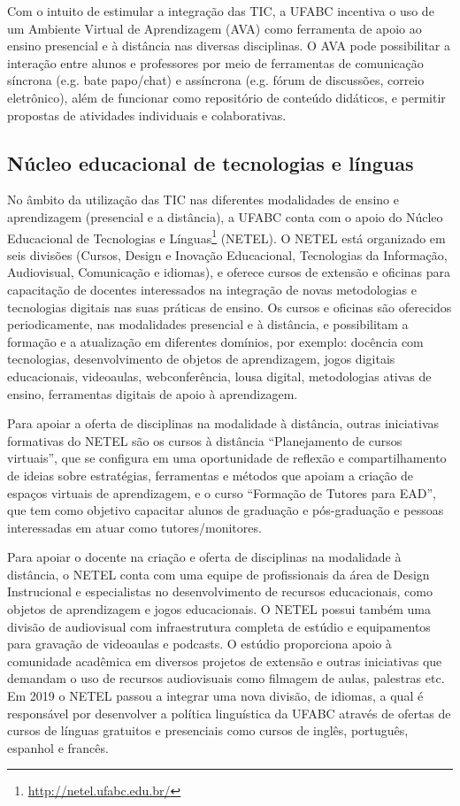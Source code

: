 Com o intuito de estimular a integração das TIC, a UFABC incentiva o uso de um
Ambiente Virtual de Aprendizagem (AVA) como ferramenta de
apoio ao ensino presencial e à distância nas diversas disciplinas. 
O AVA pode possibilitar a interação entre alunos e professores por meio de
ferramentas de comunicação síncrona (e.g. bate papo/chat) e assíncrona (e.g.
fórum de discussões, correio eletrônico), além de funcionar como repositório de
conteúdo didáticos, e permitir propostas de atividades individuais e
colaborativas.

\subsection{Núcleo educacional de tecnologias e línguas}

No âmbito da utilização das TIC nas diferentes modalidades de ensino e
aprendizagem (presencial e a distância), a UFABC conta com o
apoio do Núcleo Educacional de Tecnologias e
Línguas\footnote{\url{http://netel.ufabc.edu.br/}} (NETEL).
O NETEL está organizado em seis divisões (Cursos, Design e Inovação
Educacional, Tecnologias da Informação, Audiovisual, Comunicação e idiomas), e
oferece cursos de extensão e oficinas para capacitação de docentes interessados
na integração de novas metodologias e tecnologias digitais nas suas práticas de
ensino. 
Os cursos e oficinas são oferecidos periodicamente, nas modalidades presencial
e à distância, e possibilitam a formação e a atualização em diferentes
domínios, por exemplo: docência com tecnologias, desenvolvimento de objetos de
aprendizagem, jogos digitais educacionais, videoaulas, webconferência, lousa
digital, metodologias ativas de ensino, ferramentas digitais de apoio à
aprendizagem. 

Para apoiar a oferta de disciplinas na modalidade à distância, outras
iniciativas formativas do NETEL são os cursos à distância ``Planejamento de
cursos virtuais'', que se configura em uma oportunidade de reflexão e
compartilhamento de ideias sobre estratégias, ferramentas e métodos que apoiam
a criação de espaços virtuais de aprendizagem, e o curso ``Formação de Tutores
para EAD'', que tem como objetivo capacitar alunos de graduação e pós-graduação
e pessoas interessadas em atuar como tutores/monitores. 

Para apoiar o docente na criação e oferta de disciplinas na modalidade
à distância, o NETEL conta com uma equipe de profissionais da área de Design
Instrucional e especialistas no desenvolvimento de recursos educacionais, como
objetos de aprendizagem e jogos educacionais. 
O NETEL possui também uma divisão de audiovisual com infraestrutura completa de
estúdio e equipamentos para gravação de videoaulas e podcasts. 
O estúdio proporciona apoio à comunidade acadêmica em diversos projetos de
extensão e outras iniciativas que demandam o uso de recursos audiovisuais como
filmagem de aulas, palestras etc. 
Em 2019 o NETEL passou a integrar uma nova divisão, de idiomas, a qual é
responsável por desenvolver a política linguística da UFABC através de ofertas
de cursos de línguas gratuitos e presenciais como cursos de inglês, português,
espanhol e francês.


